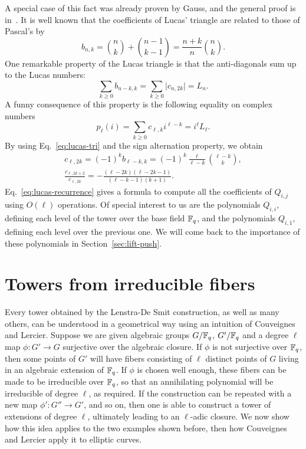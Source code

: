 \documentclass{sig-alternate}
\begin{document}
A special case of this fact was already proven by Gauss, and the
general proof is in~\cite[Proposition~1]{gurak06}.  It is well known
that the coefficients of Lucas' triangle are related to those of
Pascal's by
\begin{equation}
  \label{eq:lucas-tri}
  b_{n,k} = \binom{n}{k} + \binom{n-1}{k-1} = \frac{n+k}{n}\binom{n}{k}.
\end{equation}
One remarkable property of the Lucas triangle is that the
anti-diagonals sum up to the Lucas numbers:
\begin{equation}
  \sum_{k\ge0} b_{n-k,k} = \sum_{k\ge0} \lvert c_{n,2k}\rvert = L_n.
\end{equation}
A funny consequence of this property is the following equality on
complex numbers
\begin{equation}
  p_\ell(i) = \sum_{k\ge0} c_{\ell,k}i^{\ell-k} = i^\ell L_\ell.
\end{equation}
By using Eq.~\eqref{eq:lucas-tri} and the sign alternation property,
we obtain 
\begin{gather}
  c_{\ell,2k} = (-1)^kb_{\ell-k,k} = (-1)^k\frac{\ell}{\ell-k}\binom{\ell-k}{k},\\
  \label{eq:lucas-recurrence}
  \frac{c_{\ell,2k+2}}{c_{\ell,2k}} = 
  -\frac{(\ell-2k)(\ell-2k-1)}{(\ell-k-1)(k+1)}.
\end{gather}
Eq.~\eqref{eq:lucas-recurrence} gives a formula to compute all the
coefficients of $Q_{i,j}$ using $O(\ell)$ operations. Of special
interest to us are the polynomials $Q_{i,i}$, defining each level of
the tower over the base field $\mathbb{F}_q$, and the polynomials $Q_{i,1}$,
defining each level over the previous one. We will come back to the
importance of these polynomials in Section~\ref{sec:lift-push}.



\section{Towers from irreducible fibers}
\label{sec:fibers}
Every tower obtained by the Lenstra-De Smit construction, as well as
many others, can be understood in a geometrical way using an intuition
of Couveignes and Lercier\cite{couveignes+lercier11}. Suppose we are
given algebraic groups $G/\mathbb{F}_q$, $G'/\mathbb{F}_q$ and a degree $\ell$ map
$\phi:G'\to G$ surjective over the algebraic closure. If $\phi$ is not
surjective over $\mathbb{F}_q$, then some points of $G'$ will have fibers
consisting of $\ell$ distinct points of $G$ living in an algebraic
extension of $\mathbb{F}_q$. If $\phi$ is chosen well enough, these fibers can
be made to be irreducible over $\mathbb{F}_q$, so that an annihilating
polynomial will be irreducible of degree $\ell$, as required. If the
construction can be repeated with a new map $\phi':G''\to G'$, and so
on, then one is able to construct a tower of extensions of degree
$\ell$, ultimately leading to an $\ell$-adic closure. We now show how
this idea applies to the two examples shown before, then how
Couveignes and Lercier apply it to elliptic curves.
\end{document}
